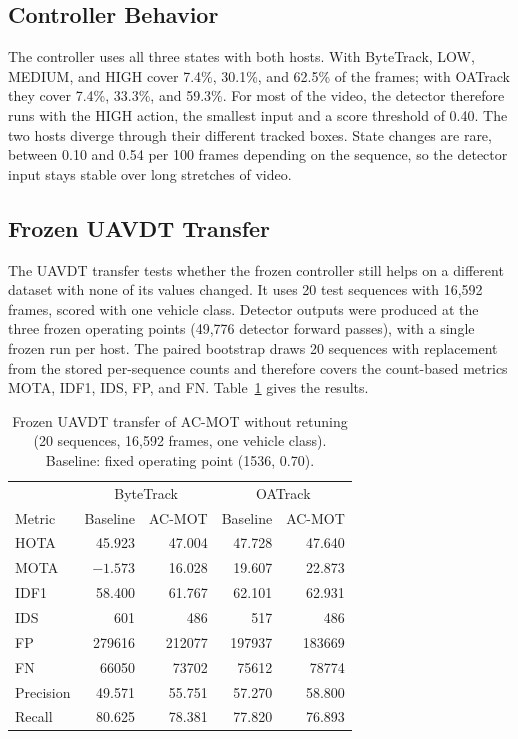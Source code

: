 \subsection{Controller Behavior}\label{sec:res-ac-behavior}
The controller uses all three states with both hosts. With ByteTrack, LOW, MEDIUM, and HIGH cover 7.4\%, 30.1\%, and 62.5\% of the frames; with OATrack they cover 7.4\%, 33.3\%, and 59.3\%. For most of the video, the detector therefore runs with the HIGH action, the smallest input and a score threshold of 0.40. The two hosts diverge through their different tracked boxes. State changes are rare, between 0.10 and 0.54 per 100 frames depending on the sequence, so the detector input stays stable over long stretches of video.

\subsection{Frozen UAVDT Transfer}\label{sec:res-ac-uavdt}
The UAVDT transfer tests whether the frozen controller still helps on a different dataset with none of its values changed. It uses 20 test sequences with 16,592 frames, scored with one vehicle class. Detector outputs were produced at the three frozen operating points (49,776 detector forward passes), with a single frozen run per host. The paired bootstrap draws 20 sequences with replacement from the stored per-sequence counts and therefore covers the count-based metrics MOTA, IDF1, IDS, FP, and FN. Table~\ref{tab:res-ac-uavdt} gives the results.

\begin{table}[tbp]
\centering
\caption{Frozen UAVDT transfer of AC-MOT without retuning (20 sequences, 16,592 frames, one vehicle class). Baseline: fixed operating point (1536, 0.70).}
\label{tab:res-ac-uavdt}
\begin{tabular}{lrrrr}
\toprule
 & \multicolumn{2}{c}{ByteTrack} & \multicolumn{2}{c}{OATrack}\\
Metric & Baseline & AC-MOT & Baseline & AC-MOT\\
\midrule
HOTA & 45.923 & 47.004 & 47.728 & 47.640\\
MOTA & $-1.573$ & 16.028 & 19.607 & 22.873\\
IDF1 & 58.400 & 61.767 & 62.101 & 62.931\\
IDS & 601 & 486 & 517 & 486\\
FP & 279616 & 212077 & 197937 & 183669\\
FN & 66050 & 73702 & 75612 & 78774\\
Precision & 49.571 & 55.751 & 57.270 & 58.800\\
Recall & 80.625 & 78.381 & 77.820 & 76.893\\
\bottomrule
\end{tabular}
\end{table}

